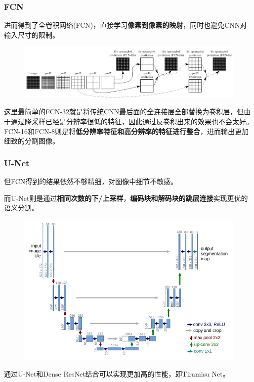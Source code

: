 \subsubsection{FCN}
进而得到了全卷积网络(FCN)\cite{long:fcn}，直接学习\textbf{像素到像素的映射}，同时也避免CNN对输入尺寸的限制。
\begin{figure}[H]
\centering
\includegraphics[width=\linewidth]{fig/fcn.jpg}
\end{figure}

这里最简单的FCN-32就是将传统CNN最后面的全连接层全部替换为卷积层，但由于通过降采样已经是分辨率很低的特征，因此通过反卷积出来的效果也不会太好。
FCN-16和FCN-8则是将\textbf{低分辨率特征和高分辨率的特征进行整合}，进而输出更加细致的分割图像。

\subsubsection{U-Net}
但FCN得到的结果依然不够精细，对图像中细节不敏感。

而U-Net\cite{olaf:unet}则是通过\textbf{相同次数的下/上采样}，\textbf{编码块和解码块的跳层连接}实现更优的语义分割。
\begin{figure}[H]
\centering
\includegraphics[width=0.8\linewidth]{fig/unet.jpg}
\end{figure}

通过U-Net和Dense ResNet结合可以实现更加高的性能，即Tiramisu Net\cite{simon:tiramisu_net_2016}。

